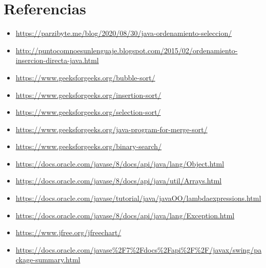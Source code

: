 \documentclass{article}
\begin{document}
\clearpage

\section{Referencias}
	
\begin{itemize}			
	\item \url{https://parzibyte.me/blog/2020/08/30/java-ordenamiento-seleccion/}
	\item \url{http://puntocomnoesunlenguaje.blogspot.com/2015/02/ordenamiento-insercion-directa-java.html}
        \item \url{https://www.geeksforgeeks.org/bubble-sort/}
        \item \url{https://www.geeksforgeeks.org/insertion-sort/}
        \item \url{https://www.geeksforgeeks.org/selection-sort/}
        \item \url{https://www.geeksforgeeks.org/java-program-for-merge-sort/}
        \item \url{https://www.geeksforgeeks.org/binary-search/}
        \item \url{https://docs.oracle.com/javase/8/docs/api/java/lang/Object.html}
        \item \url{https://docs.oracle.com/javase/8/docs/api/java/util/Arrays.html}
        \item \url{https://docs.oracle.com/javase/tutorial/java/javaOO/lambdaexpressions.html}
        \item \url{https://docs.oracle.com/javase/8/docs/api/java/lang/Exception.html}
        \item \url{https://www.jfree.org/jfreechart/}
        \item \url{https://docs.oracle.com/javase%2F7%2Fdocs%2Fapi%2F%2F/javax/swing/package-summary.html}
\end{itemize}
%
%
%
			
\end{document}
